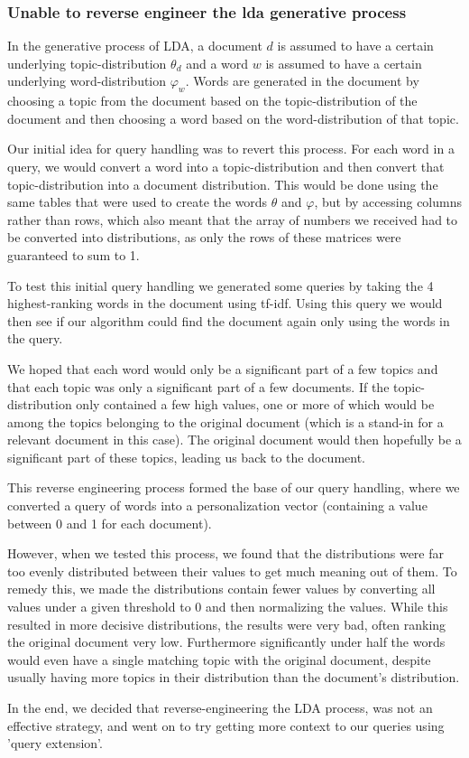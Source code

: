 \subsubsection{Unable to reverse engineer the \gls{lda} generative process}
In the generative process of LDA, a document $d$ is assumed to have a certain underlying topic-distribution $\theta_d$ and a word $w$ is assumed to have a certain underlying word-distribution $\varphi_w$.
Words are generated in the document by choosing a topic from the document based on the topic-distribution of the document and then choosing a word based on the word-distribution of that topic.

Our initial idea for query handling was to revert this process.
For each word in a query, we would convert a word into a topic-distribution and then convert that topic-distribution into a document distribution.
This would be done using the same tables that were used to create the words $\theta$ and $\varphi$, but by accessing columns rather than rows, which also meant that the array of numbers we received had to be converted into distributions, as only the rows of these matrices were guaranteed to sum to 1.

To test this initial query handling we generated some queries by taking the 4 highest-ranking words in the document using tf-idf. Using this query we would then see if our algorithm could find the document again only using the words in the query.

We hoped that each word would only be a significant part of a few topics and that each topic was only a significant part of a few documents.
If the topic-distribution only contained a few high values, one or more of which would be among the topics belonging to the original document (which is a stand-in for a relevant document in this case).
The original document would then hopefully be a significant part of these topics, leading us back to the document.

This reverse engineering process formed the base of our query handling, where we converted a query of words into a personalization vector (containing a value between 0 and 1 for each document).

However, when we tested this process, we found that the distributions were far too evenly distributed between their values to get much meaning out of them.
To remedy this, we made the distributions contain fewer values by converting all values under a given threshold to 0 and then normalizing the values.
While this resulted in more decisive distributions, the results were very bad, often ranking the original document very low.
Furthermore significantly under half the words would even have a single matching topic with the original document, despite usually having more topics in their distribution than the document's distribution.
 
In the end, we decided that reverse-engineering the LDA process, was not an effective strategy, and went on to try getting more context to our queries using 'query extension'.
